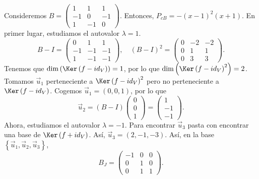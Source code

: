 \begin{eg}
	\normalfont Consideremos $\displaystyle B = \begin{pmatrix} 1 & 1 & 1 \\ - 1 & 0 & - 1 \\ 1 & - 1 & 0 \end{pmatrix} $. Entonces, $\displaystyle P_{cB} = -\left(x-1\right)^{2}\left(x+1\right) $. En primer lugar, estudiamos el autovalor $\displaystyle \lambda = 1 $. 	
	\[B - I = \begin{pmatrix} 0 & 1 & 1 \\ -1 & -1 & - 1 \\ 1 & - 1 & - 1 \end{pmatrix}, \quad\left(B - I\right)^{2} = \begin{pmatrix} 0 & - 2 & - 2 \\ 0 & 1 & 1 \\ 0 & 3 & 3 \end{pmatrix} .\]
	Tenemos que $\displaystyle \dim\left(\Ker\left(f - id _{V}\right)\right) = 1 $, por lo que $\displaystyle \dim\left(\Ker\left(f - id _{V}\right)^{2}\right)= 2 $. Tomamos $\displaystyle \vec{u}_{1} $ perteneciente a $\displaystyle \Ker\left(f - id _{V}\right)^{2} $ pero no perteneciente a $\displaystyle \Ker\left(f - id _{V}\right) $. Cogemos $\displaystyle \vec{u}_{1} = \left(0,0,1\right) $, por lo que
	\[\vec{u}_{2} = \left(B-I\right) \begin{pmatrix} 0 \\ 0 \\ 1 \end{pmatrix} = \begin{pmatrix} 1 \\ - 1 \\ - 1 \end{pmatrix} .\]
	Ahora, estudiamos el autovalor $\displaystyle \lambda = - 1 $. Para encontrar $\displaystyle \vec{u}_{3} $ pasta con encontrar una base de $\displaystyle \Ker\left(f + id _{V}\right) $. Así, $\displaystyle \vec{u}_{3} = \left(2, -1, -3\right) $. Así, en la base $\displaystyle \left\{ \vec{u}_{1}, \vec{u}_{2}, \vec{u}_{3}\right\}  $,
	\[B_{J}= \begin{pmatrix} - 1 & 0 & 0 \\ 0 & 1 & 0 \\ 0 & 1 & 1 \end{pmatrix} .\]
\end{eg}
